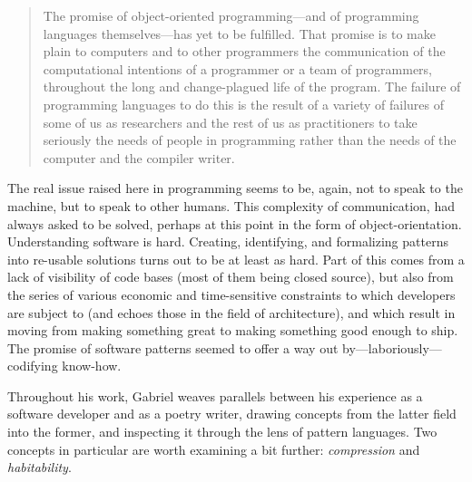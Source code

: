 \documentclass{article}
\begin{document}
\begin{quote}
  The promise of object-oriented programming—and of programming languages themselves—has yet to be fulfilled. That promise is to make plain to computers and to other programmers the communication of the computational intentions of a programmer or a team of programmers, throughout the long and change-plagued life of the program. The failure of programming languages to do this is the result of a variety of failures of some of us as researchers and the rest of us as practitioners to take seriously the needs of people in programming rather than the needs of the computer and the compiler writer.\cite{gabriel_patterns_1998}
\end{quote}

The real issue raised here in programming seems to be, again, not to speak to the machine, but to speak to other humans. This complexity of communication, had always asked to be solved, perhaps at this point in the form of object-orientation. Understanding software is hard. Creating, identifying, and formalizing patterns into re-usable solutions turns out to be at least as hard\cite{taylor_patterns_2001}. Part of this comes from a lack of visibility of code bases (most of them being closed source), but also from the series of various economic and time-sensitive constraints to which developers are subject to (and echoes those in the field of architecture), and which result in moving from making something great to making something good enough to ship. The promise of software patterns seemed to offer a way out by—laboriously—codifying know-how.

Throughout his work, Gabriel weaves parallels between his experience as a software developer and as a poetry writer, drawing concepts from the latter field into the former, and inspecting it through the lens of pattern languages. Two concepts in particular are worth examining a bit further: \emph{compression} and \emph{habitability}.
\end{document}
